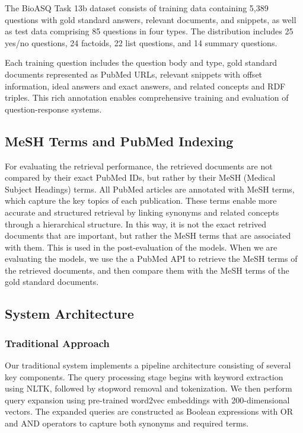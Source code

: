 \documentclass[12pt]{article}
\begin{document}
The BioASQ Task 13b dataset consists of training data containing 5,389 questions with gold standard answers, relevant documents, and snippets, as well as test data comprising 85 questions in four types. The distribution includes 25 yes/no questions, 24 factoids, 22 list questions, and 14 summary questions.

Each training question includes the question body and type, gold standard documents represented as PubMed URLs, relevant snippets with offset information, ideal answers and exact answers, and related concepts and RDF triples. This rich annotation enables comprehensive training and evaluation of question-response systems.

\subsection{MeSH Terms and PubMed Indexing}

For evaluating the retrieval performance, the retrieved documents are not compared by their exact PubMed IDs, but rather by their MeSH (Medical Subject Headings) terms. 
All PubMed articles are annotated with MeSH terms, which capture the key topics of each publication. These terms enable more accurate and structured retrieval by linking synonyms and related concepts through a hierarchical structure. In this way, it is not the exact retrived documents that are important, but rather the MeSH terms that are associated with them. This is used in the post-evaluation of the models. When we are evaluating the models, we use the a PubMed API to retrieve the MeSH terms of the retrieved documents, and then compare them with the MeSH terms of the gold standard documents.


\subsection{System Architecture}

\subsubsection{Traditional Approach}

Our traditional system implements a pipeline architecture consisting of several key components. The query processing stage begins with keyword extraction using NLTK, followed by stopword removal and tokenization. We then perform query expansion using pre-trained word2vec embeddings with 200-dimensional vectors. The expanded queries are constructed as Boolean expressions with OR and AND operators to capture both synonyms and required terms.
\end{document}
